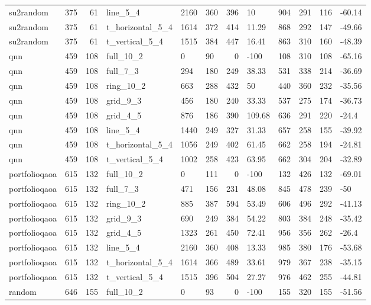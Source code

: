 \begin{longtable}{lrrlllrlllrl}
su2random & 375 & 61 & line\_5\_4 & 2160 & 360 & 396 & 10 & 904 & 291 & 116 & -60.14 \\
su2random & 375 & 61 & t\_horizontal\_5\_4 & 1614 & 372 & 414 & 11.29 & 868 & 292 & 147 & -49.66 \\
su2random & 375 & 61 & t\_vertical\_5\_4 & 1515 & 384 & 447 & 16.41 & 863 & 310 & 160 & -48.39 \\
qnn & 459 & 108 & full\_10\_2 & 0 & 90 & 0 & -100 & 108 & 310 & 108 & -65.16 \\
qnn & 459 & 108 & full\_7\_3 & 294 & 180 & 249 & 38.33 & 531 & 338 & 214 & -36.69 \\
qnn & 459 & 108 & ring\_10\_2 & 663 & 288 & 432 & 50 & 440 & 360 & 232 & -35.56 \\
qnn & 459 & 108 & grid\_9\_3 & 456 & 180 & 240 & 33.33 & 537 & 275 & 174 & -36.73 \\
qnn & 459 & 108 & grid\_4\_5 & 876 & 186 & 390 & 109.68 & 636 & 291 & 220 & -24.4 \\
qnn & 459 & 108 & line\_5\_4 & 1440 & 249 & 327 & 31.33 & 657 & 258 & 155 & -39.92 \\
qnn & 459 & 108 & t\_horizontal\_5\_4 & 1056 & 249 & 402 & 61.45 & 662 & 258 & 194 & -24.81 \\
qnn & 459 & 108 & t\_vertical\_5\_4 & 1002 & 258 & 423 & 63.95 & 662 & 304 & 204 & -32.89 \\
portfolioqaoa & 615 & 132 & full\_10\_2 & 0 & 111 & 0 & -100 & 132 & 426 & 132 & -69.01 \\
portfolioqaoa & 615 & 132 & full\_7\_3 & 471 & 156 & 231 & 48.08 & 845 & 478 & 239 & -50 \\
portfolioqaoa & 615 & 132 & ring\_10\_2 & 885 & 387 & 594 & 53.49 & 606 & 496 & 292 & -41.13 \\
portfolioqaoa & 615 & 132 & grid\_9\_3 & 690 & 249 & 384 & 54.22 & 803 & 384 & 248 & -35.42 \\
portfolioqaoa & 615 & 132 & grid\_4\_5 & 1323 & 261 & 450 & 72.41 & 956 & 356 & 262 & -26.4 \\
portfolioqaoa & 615 & 132 & line\_5\_4 & 2160 & 360 & 408 & 13.33 & 985 & 380 & 176 & -53.68 \\
portfolioqaoa & 615 & 132 & t\_horizontal\_5\_4 & 1614 & 366 & 489 & 33.61 & 979 & 367 & 238 & -35.15 \\
portfolioqaoa & 615 & 132 & t\_vertical\_5\_4 & 1515 & 396 & 504 & 27.27 & 976 & 462 & 255 & -44.81 \\
random & 646 & 155 & full\_10\_2 & 0 & 93 & 0 & -100 & 155 & 320 & 155 & -51.56 \\

\end{longtable}
